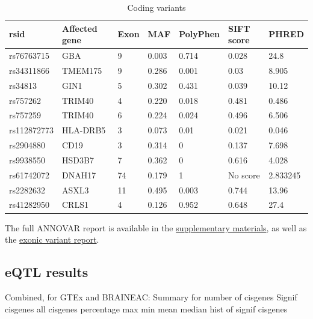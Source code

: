 \documentclass{article}
\begin{document}
\begin{table}[h]
\begin{tabular}{|l|l|l|l|l|l|l|}
\hline
rsid        & Affected gene & Exon & MAF   & PolyPhen & SIFT score & PHRED    \\ \hline
rs76763715  & GBA           & 9    & 0.003 & 0.714    & 0.028      & 24.8     \\ \hline
rs34311866  & TMEM175       & 9    & 0.286 & 0.001    & 0.03       & 8.905    \\ \hline
rs34813     & GIN1          & 5    & 0.302 & 0.431    & 0.039      & 10.12    \\ \hline
rs757262    & TRIM40        & 4    & 0.220 & 0.018    & 0.481      & 0.486    \\ \hline
rs757259    & TRIM40        & 6    & 0.224 & 0.024    & 0.496      & 6.506    \\ \hline
rs112872773 & HLA-DRB5      & 3    & 0.073 & 0.01     & 0.021      & 0.046    \\ \hline
rs2904880   & CD19          & 3    & 0.314 & 0        & 0.137      & 7.698    \\ \hline
rs9938550   & HSD3B7        & 7    & 0.362 & 0        & 0.616      & 4.028    \\ \hline
rs61742072  & DNAH17        & 74   & 0.179 & 1        & No score   & 2.833245 \\ \hline
rs2282632   & ASXL3         & 11   & 0.495 & 0.003    & 0.744      & 13.96    \\ \hline
rs41282950  & CRLS1         & 4    & 0.126 & 0.952    & 0.648      & 27.4     \\ \hline
\end{tabular}
\caption{Coding variants}
\end{table}

The full ANNOVAR report is available in the \href{https://github.com/Thomas-brightwell/PD-MSc-project-code/blob/main/Thesis/Supplementary%20materials/HighLDvariants.avinput.variant_function}{supplementary materials}, as well as the \href{https://github.com/Thomas-brightwell/PD-MSc-project-code/blob/main/Thesis/Supplementary%20materials/HighLDvariants.avinput.exonic_variant_function}{exonic variant report}.


\subsection{eQTL results}
Combined, for GTEx and BRAINEAC:
Summary for number of cisgenes
Signif cisgenes all cisgenes percentage
max
min
mean
median
hist of signif cisgenes
\end{document}
